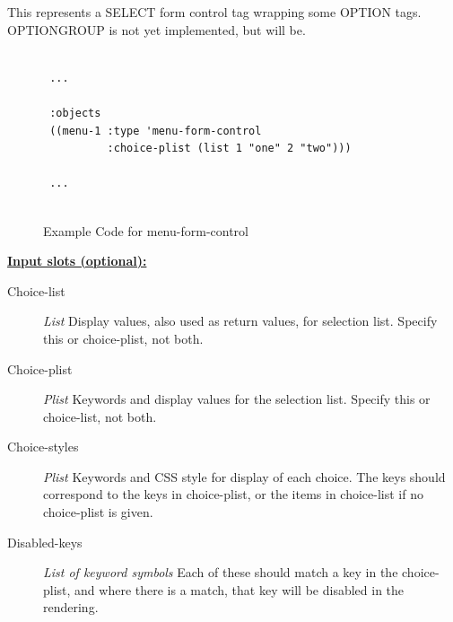 \documentclass [11pt]{book}
\begin{document}
\begin{itemize}
\begin{description}
This represents a SELECT form control tag wrapping some OPTION tags.
OPTIONGROUP is not yet implemented, but will be.



\end{description}




\begin{figure}
\begin{lrbox}{\boxedverb}
\begin{minipage}{\linewidth}
{\small

\begin{verbatim}

 ...
 
 :objects
 ((menu-1 :type 'menu-form-control
          :choice-plist (list 1 "one" 2 "two")))

 ...


\end{verbatim}}
\end{minipage}
\end{lrbox}
\fbox{\usebox{\boxedverb}}

\caption{Example Code for menu-form-control}

\label{fig:example-code-menu-form-control}

\end{figure}





\textbf{
\underline{Input slots (optional):}}

\begin{description}

\item [Choice-list]
\emph{List} Display values, also used as return values, for selection list. Specify this or choice-plist, not both.


\item [Choice-plist]
\emph{Plist} Keywords and display values for the selection list. Specify this or choice-list, not both.


\item [Choice-styles]
\emph{Plist} Keywords and CSS style for display of each choice. The keys should correspond to the
keys in choice-plist, or the items in choice-list if no choice-plist is given.


\item [Disabled-keys]
\emph{List of keyword symbols} Each of these should match a key in the choice-plist, and where there is a
match, that key will be disabled in the rendering.



\end{description}
\end{itemize}
\end{document}
